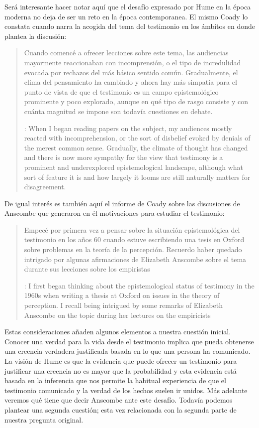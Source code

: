 Será interesante hacer notar aquí que el desafío expresado por Hume en la época
moderna no deja de ser un reto en la época contemporanea. El mismo Coady lo
constata cuando narra la acogida del tema del testimonio en los ámbitos en donde
plantea la discusión:
\blockquote[{\cite[vii]{coady1992test}}: When I began reading papers on the
subject, my audiences mostly reacted with incomprehension, or the sort of
disbelief evoked by denials of the merest common sense. Gradually, the climate
of thought has changed and there is now more sympathy for the view that
testimony is a prominent and underexplored epistemological landscape, although
what sort of feature it is and how largely it looms are still naturally matters
for disagreement.]{Cuando comencé a ofrecer lecciones sobre este tema, las
  audiencias mayormente reaccionaban con incomprensión, o el tipo de
  incredulidad evocada por rechazos del más básico sentido común. Gradualmente,
  el clima del pensamiento ha cambiado y ahora hay más simpatía para el punto de
  vista de que el testimonio es un campo epistemológico prominente y poco
  explorado, aunque en qué tipo de rasgo consiste y con cuánta magnitud se
  impone son todavía cuestiones en debate.}
De igual interés es también aquí el informe de Coady sobre las discusiones de
Anscombe que generaron en él motivaciones para estudiar el testimonio:
\blockquote[{\cite[vii]{coady1992test}}: I first began thinking about the
epistemological status of testimony in the 1960s when writing a thesis at Oxford
on issues in the theory of perception. \textelp{} I recall being intrigued by
some remarks of Elizabeth Anscombe on the topic during her lectures on the
empiricists \textelp{}]{Empecé por primera vez a pensar sobre la situación
  epistemológica del testimonio en los años 60 cuando estuve escribiendo una
  tesis en Oxford sobre problemas en la teoría de la percepción. \textelp{}
  Recuerdo haber quedado intrigado por algunas afirmaciones de Elizabeth
  Anscombe sobre el tema durante sus lecciones sobre los empiristas \textelp{}}

Estas consideraciones añaden algunos elementos a nuestra cuestión inicial.
Conocer una verdad para la vida desde el testimonio implica que pueda obtenerse
una creencia verdadera justificada basada en lo que una persona ha comunicado.
La visión de Hume es que la evidencia que puede ofrecer un testimonio para
justificar una creencia no es mayor que la probabilidad y esta evidencia está
basada en la inferencia que nos permite la habitual experiencia de que el
testimonio comunicado y la verdad de los hechos suelen ir unidos. Más adelante
veremos qué tiene que decir Anscombe ante este desafío. Todavía podemos plantear
una segunda cuestión; esta vez relacionada con la segunda parte de nuestra
pregunta original.

